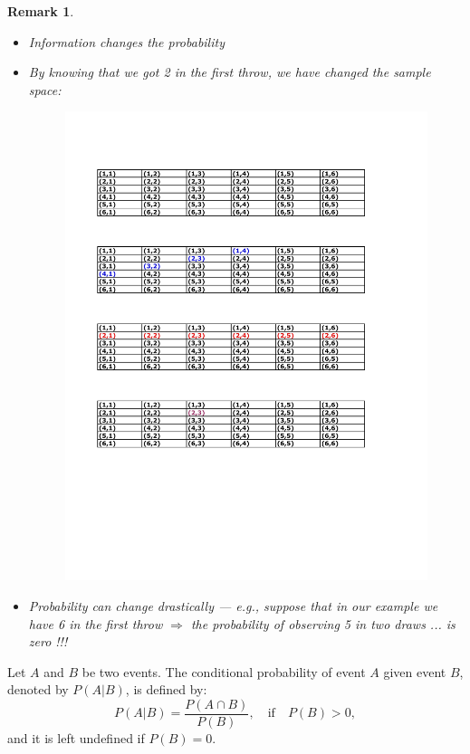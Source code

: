 \documentclass[notes=show, handout]{beamer}\usepackage[]{graphicx}\usepackage[]{color}
\newtheorem{remark}{Remark}[section]
\begin{document}
\begin{frame}{\secname}
  \begin{remark}
  \begin{itemize}
  \item Information changes the probability
  \item By knowing that we got 2 in the first throw, we have changed the sample space:
  \begin{figure}[h!]
  \centering
  \includegraphics[scale=0.65]{img/c3.pdf}
  \end{figure}
  \item Probability can change drastically --- e.g., suppose that in our example we have 6 in the first throw $\Rightarrow$ the probability of
  observing 5 in two draws ... is zero !!!
  \end{itemize}
  \end{remark}
\end{frame}

\begin{frame}{\secname}

  \begin{definition}
  Let $A$ and $B$ be two events. The conditional probability of event $A$
  given event $B$, denoted by $P\left(A\vert B\right)$, is defined by:
  $$
  P\left(A\vert B\right) = \frac{P(A \cap B)}{P(B)}, \quad \text{if} \quad P(B) >0,
  $$
  and it is left undefined if $P(B)=0$.
  \end{definition}
\end{frame}
\end{document}
